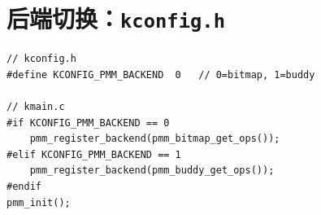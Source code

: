 \section{后端切换：\texttt{kconfig.h}}

\begin{lstlisting}[style=cstyle]
// kconfig.h
#define KCONFIG_PMM_BACKEND  0   // 0=bitmap, 1=buddy

// kmain.c
#if KCONFIG_PMM_BACKEND == 0
    pmm_register_backend(pmm_bitmap_get_ops());
#elif KCONFIG_PMM_BACKEND == 1
    pmm_register_backend(pmm_buddy_get_ops());
#endif
pmm_init();
\end{lstlisting}


